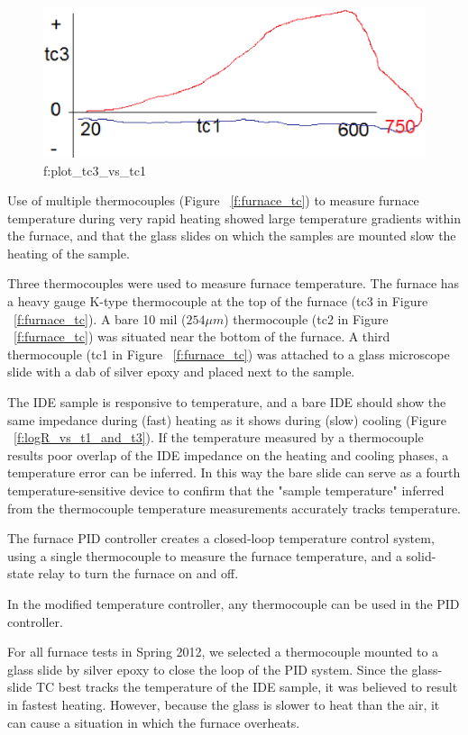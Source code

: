 	\begin{figure}
		\includegraphics[width=150mm]{images/residual_plot_tc3_vs_tc1.eps}
		\caption{f:plot\_tc3\_vs\_tc1}
		\label{f:plot_tc3_vs_tc1}
	\end{figure}
	
	Use of multiple thermocouples (Figure ~\ref{f:furnace_tc}) to measure furnace temperature during very rapid heating showed large temperature gradients within the furnace, and that the glass slides on which the samples are mounted slow the heating of the sample.

	Three thermocouples were used to measure furnace temperature.  
	The furnace has a heavy gauge K-type thermocouple at the top of the furnace (tc3 in Figure ~\ref{f:furnace_tc}).  
	A bare 10 mil ($254{\mu}m$) thermocouple (tc2 in Figure ~\ref{f:furnace_tc}) was situated near the bottom of the furnace.  
	A third thermocouple (tc1 in Figure ~\ref{f:furnace_tc}) was attached to a glass microscope slide with a dab of silver epoxy and placed next to the sample.
	
	The IDE sample is responsive to temperature, and a bare IDE should show the same impedance during (fast) heating as it shows during (slow) cooling (Figure ~\ref{f:logR_vs_t1_and_t3}).  
	If the temperature measured by a thermocouple results poor overlap of the IDE impedance on the heating and cooling phases, a temperature error can be inferred.
	In this way the bare slide can serve as a fourth temperature-sensitive device to confirm that the "sample temperature" inferred from the thermocouple temperature measurements accurately tracks temperature.  
	
	The furnace PID controller creates a closed-loop temperature control system, using a single thermocouple to measure the furnace temperature, and a solid-state relay to turn the furnace on and off. 

	In the modified temperature controller, any thermocouple can be used in the PID controller.	
	
	For all furnace tests in Spring 2012, we selected a thermocouple mounted to a glass slide by silver epoxy to close the loop of the PID system.
	Since the glass-slide TC best tracks the temperature of the IDE sample, it was believed to result in fastest heating.
	However, because the glass is slower to heat than the air, it can cause a situation in which the furnace overheats. 
	
